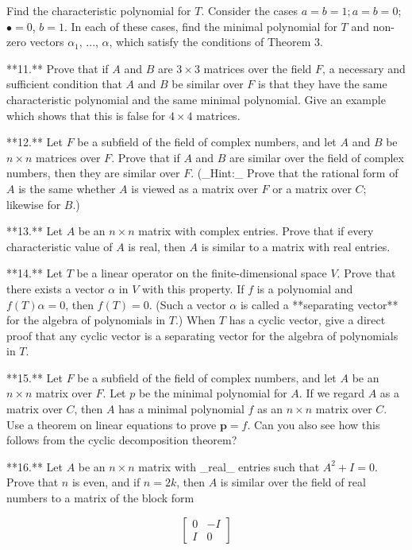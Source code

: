 
Find the characteristic polynomial for \(T\). Consider the cases \(a=b=1;a=b=0\); \(\bullet=0\), \(b=1\). In each of these cases, find the minimal polynomial for \(T\) and non-zero vectors \(\alpha_{1}\), ..., \(\alpha\), which satisfy the conditions of Theorem 3.

**11.** Prove that if \(A\) and \(B\) are \(3\times 3\) matrices over the field \(F\), a necessary and sufficient condition that \(A\) and \(B\) be similar over \(F\) is that they have the same characteristic polynomial and the same minimal polynomial. Give an example which shows that this is false for \(4\times 4\) matrices.

**12.** Let \(F\) be a subfield of the field of complex numbers, and let \(A\) and \(B\) be \(n\times n\) matrices over \(F\). Prove that if \(A\) and \(B\) are similar over the field of complex numbers, then they are similar over \(F\). (_Hint:_ Prove that the rational form of \(A\) is the same whether \(A\) is viewed as a matrix over \(F\) or a matrix over \(C\); likewise for \(B\).)

**13.** Let \(A\) be an \(n\times n\) matrix with complex entries. Prove that if every characteristic value of \(A\) is real, then \(A\) is similar to a matrix with real entries.

**14.** Let \(T\) be a linear operator on the finite-dimensional space \(V\). Prove that there exists a vector \(\alpha\) in \(V\) with this property. If \(f\) is a polynomial and \(f(T)\alpha=0\), then \(f(T)=0\). (Such a vector \(\alpha\) is called a **separating vector** for the algebra of polynomials in \(T\).) When \(T\) has a cyclic vector, give a direct proof that any cyclic vector is a separating vector for the algebra of polynomials in \(T\).

**15.** Let \(F\) be a subfield of the field of complex numbers, and let \(A\) be an \(n\times n\) matrix over \(F\). Let \(p\) be the minimal polynomial for \(A\). If we regard \(A\) as a matrix over \(C\), then \(A\) has a minimal polynomial \(f\) as an \(n\times n\) matrix over \(C\). Use a theorem on linear equations to prove \(\boldsymbol{p}=f\). Can you also see how this follows from the cyclic decomposition theorem?

**16.** Let \(A\) be an \(n\times n\) matrix with _real_ entries such that \(A^{2}+I=0\). Prove that \(n\) is even, and if \(n=2k\), then \(A\) is similar over the field of real numbers to a matrix of the block form

\[\begin{bmatrix}0&-I\\ I&0\end{bmatrix}\]

